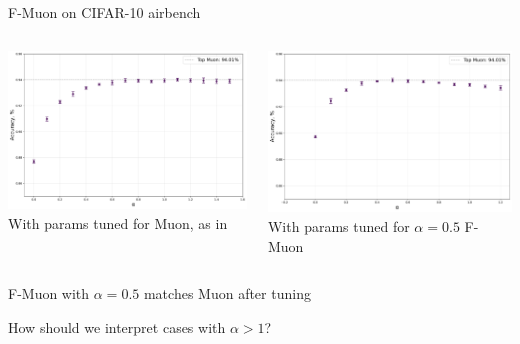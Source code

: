 \documentclass[aspectratio=169]{beamer}
\begin{document}
\begin{frame}{F-Muon on CIFAR-10 airbench}
    \begin{columns}[T,totalwidth=\textwidth]
      \begin{column}{0.48\textwidth}
        \includegraphics[width=\linewidth]{muon_tuned_diff_alpha.pdf}
        \centering
        \scriptsize With params tuned for Muon, as in \citep{cifar2023airbench}
      \end{column}
      \begin{column}{0.48\textwidth}
        \includegraphics[width=\linewidth]{fmuon_tuned_diff_alpha.pdf}
        \centering
        \scriptsize With params tuned for $\alpha=0.5$ F-Muon
      \end{column}
    \end{columns}
    \vspace{0.6em}
    \centering

    \footnotesize F-Muon with \(\alpha = 0.5\) matches Muon after tuning

    \faQuestionCircle \space How should we interpret cases with $\alpha > 1$?
  \end{frame}
\end{document}
